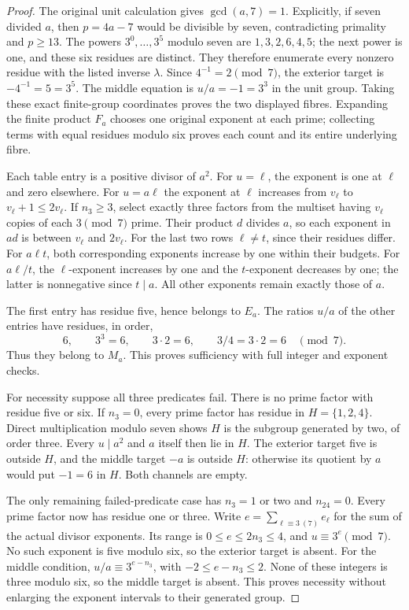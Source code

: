 \begin{proof}
The original unit calculation gives \(\gcd(a,7)=1\).
Explicitly, if seven divided \(a\), then \(p=4a-7\) would be
divisible by seven, contradicting primality and \(p\ge13\).
The powers \(3^0,\ldots,3^5\) modulo seven are
\(1,3,2,6,4,5\); the next power is one, and these six residues
are distinct. They therefore enumerate every nonzero residue
with the listed inverse \(\lambda\).
Since \(4^{-1}=2\pmod7\), the exterior target is
\(-4^{-1}=5=3^5\). The middle equation is \(u/a=-1=3^3\)
in the unit group. Taking these exact finite-group coordinates
proves the two displayed fibres. Expanding the finite product
\(F_a\) chooses one original exponent at each prime; collecting
terms with equal residues modulo six proves each count and its
entire underlying fibre.

Each table entry is a positive divisor of \(a^2\). For \(u=\ell\),
the exponent is one at \(\ell\) and zero elsewhere. For \(u=a\ell\)
the exponent at \(\ell\) increases from \(v_\ell\) to
\(v_\ell+1\le2v_\ell\). If \(n_3\ge3\), select exactly three
factors from the multiset having \(v_\ell\) copies of each
\(3\pmod7\) prime. Their product \(d\) divides \(a\), so
each exponent in \(ad\) is between \(v_\ell\) and \(2v_\ell\).
For the last two rows \(\ell\ne t\), since their residues differ.
For \(a\ell t\), both corresponding exponents increase by one
within their budgets. For \(a\ell/t\), the \(\ell\)-exponent
increases by one and the \(t\)-exponent decreases by one; the
latter is nonnegative since \(t\mid a\). All other exponents
remain exactly those of \(a\).

The first entry has residue five, hence belongs to \(E_a\).
The ratios \(u/a\) of the other entries have residues, in order,
\[
 6,\qquad 3^3=6,\qquad3\cdot2=6,\qquad3/4=3\cdot2=6
 \quad\pmod7.
\]
Thus they belong to \(M_a\). This proves sufficiency with full
integer and exponent checks.

For necessity suppose all three predicates fail. There is no prime
factor with residue five or six. If \(n_3=0\), every prime factor
has residue in \(H=\{1,2,4\}\). Direct multiplication modulo
seven shows \(H\) is the subgroup generated by two, of order
three. Every \(u\mid a^2\) and \(a\) itself then lie in \(H\).
The exterior target five is outside \(H\), and the middle target
\(-a\) is outside \(H\): otherwise its quotient by \(a\)
would put \(-1=6\) in \(H\). Both channels are empty.

The only remaining failed-predicate case has \(n_3=1\) or two
and \(n_{24}=0\). Every prime factor now has residue one or
three. Write \(e=\sum_{\ell\equiv3\ (7)}e_\ell\) for the
sum of the actual divisor exponents. Its range is
\(0\le e\le2n_3\le4\), and \(u\equiv3^e\pmod7\).
No such exponent is five modulo six, so the exterior target
is absent. For the middle condition,
\(u/a\equiv3^{e-n_3}\), with \(-2\le e-n_3\le2\).
None of these integers is three modulo six, so the middle
target is absent. This proves necessity without enlarging
the exponent intervals to their generated group.
\end{proof}

